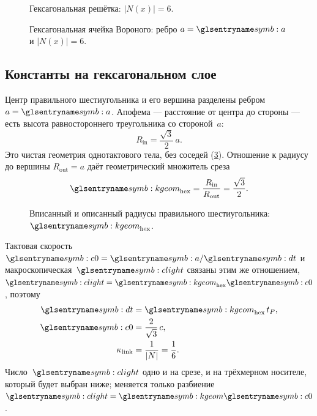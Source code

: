 \begin{figure}[htbp]
  \centering
  
  \caption{Гексагональная решётка: $|N(x)|=6$.}
  \label{fig:carrier-neighbors-hex}
\end{figure}

\begin{figure}[htbp]
  \centering
  
  \caption{Гексагональная ячейка Вороного: ребро $a=\caStepSpace$ и $|N(x)|=6$.}
  \label{fig:carrier-hex-neighbors}
\end{figure}

\subsection{Константы на гексагональном слое}

Центр правильного шестиугольника и его вершина разделены ребром~$a=\caStepSpace$.
Апофема --- расстояние от центра до стороны --- есть высота равностороннего треугольника со стороной~$a$:
\[
  R_{\mathrm{in}}=\frac{\sqrt{3}}{2}\,a.
\]
Это чистая геометрия однотактового тела, без соседей
(\cref{fig:carrier-hex-radii}).
Отношение к радиусу до вершины $R_{\mathrm{out}}=a$ даёт геометрический множитель среза
\[
  \caKappaGeom_{\mathrm{hex}}=\frac{R_{\mathrm{in}}}{R_{\mathrm{out}}}=\frac{\sqrt{3}}{2}.
\]

\begin{figure}[htbp]
  \centering
  
  \caption{Вписанный и описанный радиусы правильного шестиугольника: $\caKappaGeom_{\mathrm{hex}}$.}
  \label{fig:carrier-hex-radii}
\end{figure}

Тактовая скорость $\caSignalSpeed=\caStepSpace/\htick$ и макроскопическая~$\speedC$ связаны этим же отношением, $\speedC=\caKappaGeom_{\mathrm{hex}} \caSignalSpeed$,
поэтому
\begin{align}
  \htick &= \caKappaGeom_{\mathrm{hex}}\,t_P, \\
  \caSignalSpeed &= \frac{2}{\sqrt{3}}\,c, \\
  \kappa_{\mathrm{link}} &= \frac{1}{|N|} = \frac{1}{6}.
  \label{eq:hex-bridge-constants}
\end{align}
Число~$\speedC$ одно и на срезе, и на трёхмерном носителе, который будет выбран ниже;
меняется только разбиение $\speedC=\caKappaGeom \caSignalSpeed$.

